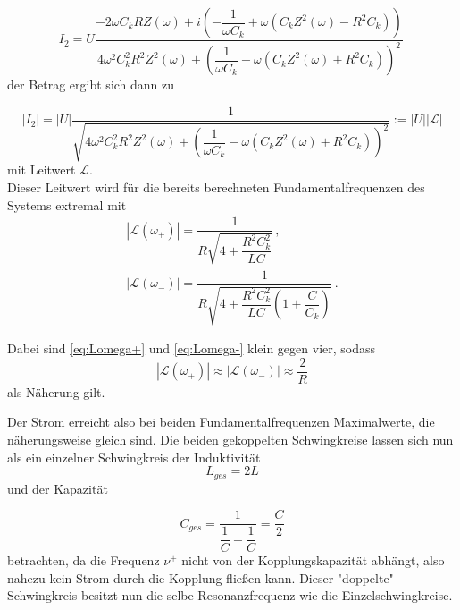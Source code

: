 \begin{equation}
    I_2 = U \dfrac{-2 ω C_k R Z(ω) + i \left(-\dfrac{1}{ωC_k} + ω (C_k Z^2(ω) -  R^2 C_k) \right)}{4 ω^2 C^2_k R^2 Z^2(ω) + \left(\dfrac{1}{ω C_k} - ω (C_k Z^2(ω) +  R^2 C_k) \right)^2}\,
\end{equation} der Betrag ergibt sich dann zu

\begin{equation}
    |I_2| = |U| \dfrac{1}{\sqrt{4 ω^2 C^2_k R^2 Z^2(ω) + \left(\dfrac{1}{ω C_k} - ω (C_k Z^2(ω) +  R^2 C_k) \right)^2}} := |U||\mathcal{L}|
\end{equation} mit Leitwert $\mathcal{L}$.\\

Dieser Leitwert wird für die bereits berechneten Fundamentalfrequenzen des Systems extremal mit
\begin{align}
    |\mathcal{L}(ω_+)| = \dfrac{1}{R \sqrt{4+ \dfrac{R^2 C^2_k}{L C}}} \label{eq:Lomega+}\,, \\
    |\mathcal{L}(ω_-)| = \dfrac{1}{R \sqrt{4+ \dfrac{R^2 C^2_k}{L C} \left(1 + \dfrac{C}{C_k}\right)}} \label{eq:Lomega-}\,.
\end{align}

Dabei sind \eqref{eq:Lomega+} und \eqref{eq:Lomega-} klein gegen vier, sodass
\begin{equation*}
    |\mathcal{L}(ω_+)| \approx |\mathcal{L}(ω_-)| \approx \dfrac{2}{R} 
\end{equation*} als Näherung gilt.

Der Strom erreicht also bei beiden Fundamentalfrequenzen Maximalwerte, die näherungsweise gleich sind. Die beiden gekoppelten Schwingkreise lassen sich nun als ein einzelner Schwingkreis der Induktivität
\begin{equation*}
    L_{ges} = 2 L
\end{equation*} und der Kapazität 

\begin{equation*}
    C_{ges} = \dfrac{1}{\dfrac{1}{C} + \dfrac{1}{C}} = \dfrac{C}{2}
\end{equation*} betrachten, da die Frequenz $ν^+$ nicht von der Kopplungskapazität abhängt, also nahezu kein Strom durch die Kopplung fließen kann.
Dieser "doppelte" Schwingkreis besitzt nun die selbe Resonanzfrequenz wie die Einzelschwingkreise. 

